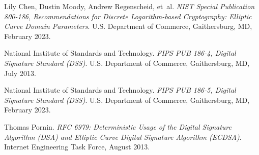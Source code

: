 \documentclass[12pt, letterpaper]{article}
\begin{document}
	\begin{thebibliography}{99}
		
		Lily Chen, Dustin Moody, Andrew Regenscheid, et~al.
		\newblock \emph{{NIST Special Publication 800-186, Recommendations for Discrete
				Logarithm-based Cryptography: Elliptic Curve Domain Parameters}}.
		\newblock U.S. Department of Commerce, Gaithersburg, MD, February 2023.
		
		National Institute of Standards and Technology.
		\newblock \emph{{FIPS PUB 186-4, Digital Signature Standard (DSS)}}.
		\newblock U.S. Department of Commerce, Gaithersburg, MD, July 2013.
		
		National Institute of Standards and Technology.
		\newblock \emph{{FIPS PUB 186-5, Digital Signature Standard (DSS)}}.
		\newblock U.S. Department of Commerce, Gaithersburg, MD, February 2023.
		
		Thomas Pornin.
		\newblock \emph{{RFC 6979: Deterministic Usage of the Digital Signature
				Algorithm (DSA) and Elliptic Curve Digital Signature Algorithm (ECDSA)}}.
		\newblock Internet Engineering Task Force, August 2013.
		
	\end{thebibliography}
	\newpage
	\appendix
%	
%	
%	
%	
%	
	
\end{document}
